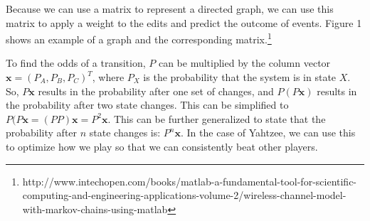 Because we can use a matrix to represent a directed graph, we can use this matrix
to apply a weight to the edits and predict the outcome of events. Figure 1
shows an example of a graph and the corresponding matrix.\footnote{http://www.intechopen.com/books/matlab-a-fundamental-tool-for-scientific-computing-and-engineering-applications-volume-2/wireless-channel-model-with-markov-chains-using-matlab}

To find the odds of a transition, $P$ can be multiplied by the column vector
$\mathbf{x}=({P_A, P_B, P_C})^T$, where $P_X$ is the probability that the system
is in state $X$. So, $P\mathbf{x}$ results in the probability after one set
of changes, and $P(P\mathbf{x})$ results in the probability after two state
changes. This can be simplified to $P(P\mathbf{x} = (PP)\mathbf{x} = P^2\mathbf{x}$.
This can be further generalized to state that the probability after $n$ state
changes is: $P^n\mathbf{x}$. In the case of Yahtzee, we can use this to optimize
how we play so that we can consistently beat other players.
